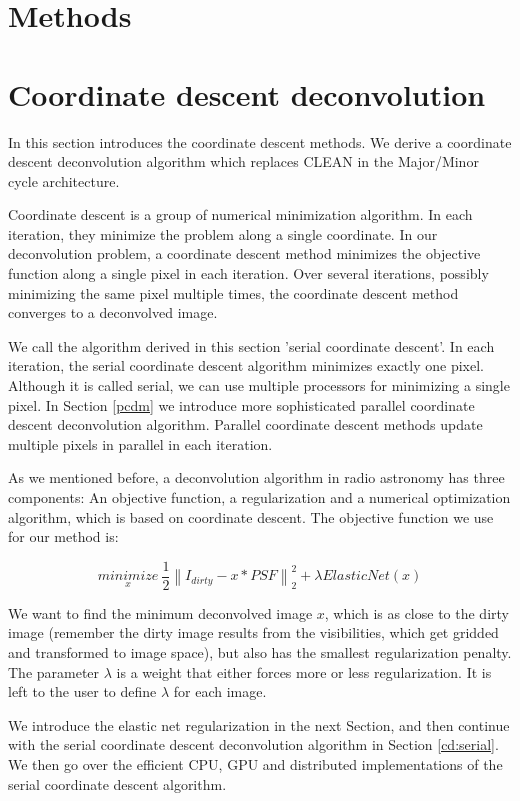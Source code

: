\section{Methods}

\section{Coordinate descent deconvolution}\label{cd}
In this section introduces the coordinate descent methods. We derive a coordinate descent deconvolution algorithm which replaces CLEAN in the Major/Minor cycle architecture.

Coordinate descent is a group of numerical minimization algorithm. In each iteration, they minimize the problem along a single coordinate. In our deconvolution problem, a coordinate descent method minimizes the objective function along a single pixel in each iteration. Over several iterations, possibly minimizing the same pixel multiple times, the coordinate descent method converges to a deconvolved image.

We call the algorithm derived in this section 'serial coordinate descent'. In each iteration, the serial coordinate descent algorithm minimizes exactly one pixel. Although it is called serial, we can use multiple processors for minimizing a single pixel. In Section \ref{pcdm} we introduce more sophisticated parallel coordinate descent deconvolution algorithm. Parallel coordinate descent methods update multiple pixels in parallel in each iteration.

As we mentioned before, a deconvolution algorithm in radio astronomy has three components: An objective function, a regularization and a numerical optimization algorithm, which is based on coordinate descent. The objective function we use for our method is: 

\begin{equation}\label{cd:deconv}
\underset{x}{minimize} \: \frac{1}{2} \left \| I_{dirty} - x * PSF \right \|_2^2 + \lambda ElasticNet(x)
\end{equation}

We want to find the minimum deconvolved image $x$, which is as close to the dirty image (remember the dirty image results from the visibilities, which get gridded and transformed to image space), but also has the smallest regularization penalty. The parameter $\lambda$ is a weight that either forces more or less regularization. It is left to the user to define $\lambda$ for each image. 

We introduce the elastic net regularization in the next Section, and then continue with the serial coordinate descent deconvolution algorithm in Section \ref{cd:serial}. We then go over the efficient CPU, GPU and distributed implementations of the serial coordinate descent algorithm.



